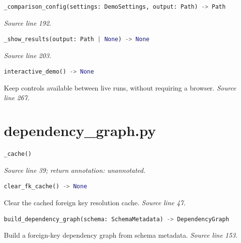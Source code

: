 

\begin{lstlisting}[language=Python]
_comparison_config(settings: DemoSettings, output: Path) -> Path
\end{lstlisting}


{\small \textit{Source line 192.}}



\begin{lstlisting}[language=Python]
_show_results(output: Path | None) -> None
\end{lstlisting}


{\small \textit{Source line 203.}}



\begin{lstlisting}[language=Python]
interactive_demo() -> None
\end{lstlisting}


{\small Keep controls available between live runs, without requiring a browser. \textit{Source line 267.}}

\section{dependency\_graph.py}




\begin{lstlisting}[language=Python]
_cache()
\end{lstlisting}


{\small \textit{Source line 39; return annotation: unannotated.}}



\begin{lstlisting}[language=Python]
clear_fk_cache() -> None
\end{lstlisting}


{\small Clear the cached foreign key resolution cache. \textit{Source line 47.}}



\begin{lstlisting}[language=Python]
build_dependency_graph(schema: SchemaMetadata) -> DependencyGraph
\end{lstlisting}


{\small Build a foreign-key dependency graph from schema metadata. \textit{Source line 153.}}

